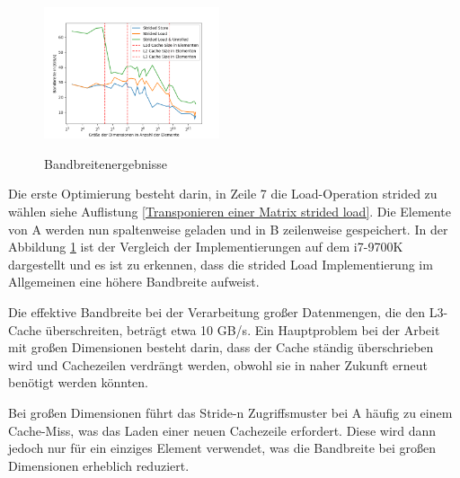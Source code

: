 \documentclass[sigconf,language=ngerman]{acmart}
\begin{document}
    \begin{figure}[h]
        \hspace{-0.46cm} %
        \caption{Bandbreitenergebnisse}
        \includegraphics[width=0.46\textwidth]{Abbildung 15.png}
        \label{strided load vs. strided store}
    \end{figure}
Die erste Optimierung besteht darin, in Zeile 7 die Load-Operation strided zu wählen 
siehe Auflistung \ref{Transponieren einer Matrix strided load}.
Die Elemente von A werden nun spaltenweise geladen und in B zeilenweise gespeichert.
In der Abbildung \ref{strided load vs. strided store} ist der Vergleich der Implementierungen auf dem i7-9700K dargestellt und 
es ist zu erkennen, dass die strided Load Implementierung im Allgemeinen eine höhere Bandbreite aufweist.


Die effektive Bandbreite bei der Verarbeitung großer Datenmengen, 
die den L3-Cache überschreiten, beträgt etwa 10 GB/s. 
Ein Hauptproblem bei der Arbeit mit großen Dimensionen besteht darin, 
dass der Cache ständig überschrieben wird und Cachezeilen verdrängt werden, 
obwohl sie in naher Zukunft erneut benötigt werden könnten.

Bei großen Dimensionen führt das Stride-n Zugriffsmuster bei A häufig zu einem Cache-Miss, 
was das Laden einer neuen Cachezeile erfordert. 
Diese wird dann jedoch nur für ein einziges Element verwendet, 
was die Bandbreite bei großen Dimensionen erheblich reduziert.
\end{document}
